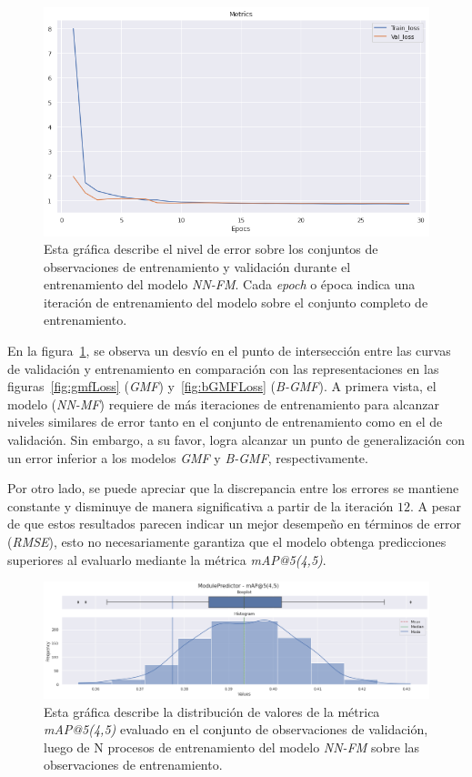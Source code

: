 \documentclass[11pt,a4paper,twoside]{thesis}
\begin{document}
\begin{figure}[h!]
	\centering
	\includegraphics[width=13cm]{./images/metrics-NN-FM-train-val-loss.png}
	\caption{
		Esta gráfica describe el nivel de error sobre los
		conjuntos de observaciones de entrenamiento y validación durante
		el entrenamiento del modelo \textit{NN-FM}. Cada \textit{epoch} o época
		indica una iteración de entrenamiento del modelo sobre el conjunto
		completo de entrenamiento.
	}
	\label{fig:nnFmLoss}
\end{figure}

En la figura~\ref{fig:nnFmLoss}, se observa un desvío en el punto de
intersección entre las curvas de validación y entrenamiento en comparación con
las representaciones en las figuras~\ref{fig:gmfLoss} (\textit{GMF})
y~\ref{fig:bGMFLoss} (\textit{B-GMF}). A primera vista, el modelo
(\textit{NN-MF}) requiere de más iteraciones de entrenamiento para alcanzar
niveles similares de error tanto en el conjunto de entrenamiento como en el de
validación. Sin embargo, a su favor, logra alcanzar un punto de generalización
con un error inferior a los modelos \textit{GMF} y \textit{B-GMF},
respectivamente.

Por otro lado, se puede apreciar que la discrepancia entre los errores se
mantiene constante y disminuye de manera significativa a partir de la iteración
$12$. A pesar de que estos resultados parecen indicar un mejor desempeño en
términos de error (\textit{RMSE}), esto no necesariamente garantiza que el
modelo obtenga predicciones superiores al evaluarlo mediante la métrica
\textit{mAP@5(4,5)}.

\clearpage

\begin{figure}[h!]
	\centering
	\includegraphics[width=15cm]{./images/metrics-NN-FM-mapk.png}
	\caption{
		Esta gráfica describe la distribución de valores de la
		métrica \textit{mAP@5(4,5)} evaluado en el conjunto de
		observaciones de validación, luego de N procesos de
		entrenamiento del modelo \textit{NN-FM} sobre las observaciones
		de entrenamiento.
	}
	\label{fig:nnFmMAP}
\end{figure}
\end{document}

